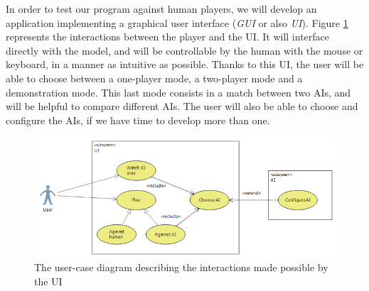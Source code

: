 In order to test our program against human players, we will develop an application implementing a graphical user interface (\emph{GUI} or also \emph{UI}).
Figure \ref{fig:UCD_Play} represents the interactions between the player and the UI.
It will interface directly with the model, and will be controllable by the human with the mouse or keyboard, in a manner as intuitive as possible.
Thanks to this UI, the user will be able to choose between a one-player mode, a two-player mode and a demonstration mode.
This last mode consists in a match between two AIs, and will be helpful to compare different AIs.
The user will also be able to choose and configure the AIs, if we have time to develop more than one.

\begin{figure}[H]
\centering
\includegraphics[width=\textwidth]{2General_Architecture/2.1Behaviour_of_the_Game/Pictures/Application_UCD}
\caption{The user-case diagram describing the interactions made possible by the UI}
\label{fig:UCD_Play}
\end{figure}